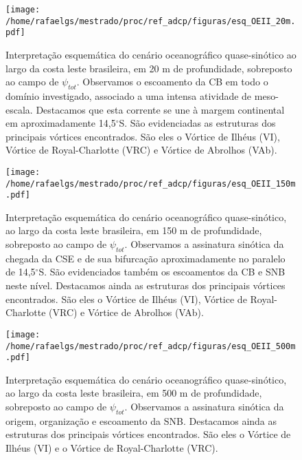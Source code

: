 \begin{figure}%
 \begin{center}
  \texttt{[image: /home/rafaelgs/mestrado/proc/ref\_adcp/figuras/esq\_OEII\_20m.pdf]}
 \end{center}
 \vspace{-.5cm}
 \renewcommand{\baselinestretch}{1}
 \caption{\label{fig:esq20} \small Interpretação esquemática do cenário oceanográfico 
quase-sinótico ao largo da costa leste brasileira, em 20 m de profundidade, sobreposto ao campo de $\psi_{tot}$.
 Observamos o escoamento da CB em todo 
o domínio investigado, associado a uma intensa atividade de meso-escala. Destacamos que esta corrente se une à 
margem continental em aproximadamente 14,5$^\circ$S.
São evidenciadas as estruturas dos principais vórtices encontrados. São eles o 
Vórtice de Ilhéus (VI), Vórtice de Royal-Charlotte (VRC) e Vórtice de Abrolhos (VAb).}
\end{figure}

\begin{figure}%
 \begin{center}
  \texttt{[image: /home/rafaelgs/mestrado/proc/ref\_adcp/figuras/esq\_OEII\_150m.pdf]}
 \end{center}
 \vspace{-.5cm}
 \renewcommand{\baselinestretch}{1}
 \caption{\label{fig:esq150} \small Interpretação esquemática do cenário oceanográfico 
quase-sinótico, ao largo da costa leste brasileira, em 150 m de profundidade, sobreposto ao campo de $\psi_{tot}$.
Observamos a assinatura sinótica da chegada da CSE e de sua bifurcação aproximadamente no paralelo de 14,5$^\circ$S.
São evidenciados também os escoamentos da CB e SNB neste nível. Destacamos ainda as estruturas dos principais vórtices encontrados. São eles o Vórtice de Ilhéus (VI), Vórtice de Royal-Charlotte (VRC) e Vórtice de Abrolhos (VAb).}
\end{figure}

\begin{figure}%
 \begin{center}
  \texttt{[image: /home/rafaelgs/mestrado/proc/ref\_adcp/figuras/esq\_OEII\_500m.pdf]}
 \end{center}
 \vspace{-.5cm}
 \renewcommand{\baselinestretch}{1}
 \caption{\label{fig:esq500} \small Interpretação esquemática do cenário oceanográfico 
quase-sinótico, ao largo da costa leste brasileira, em 500 m de profundidade, sobreposto ao campo de $\psi_{tot}$.
Observamos a assinatura sinótica da origem, organização e escoamento da SNB. Destacamos ainda as
estruturas dos principais vórtices encontrados. São eles o Vórtice de Ilhéus (VI) e o Vórtice de Royal-Charlotte (VRC).}
\end{figure}

